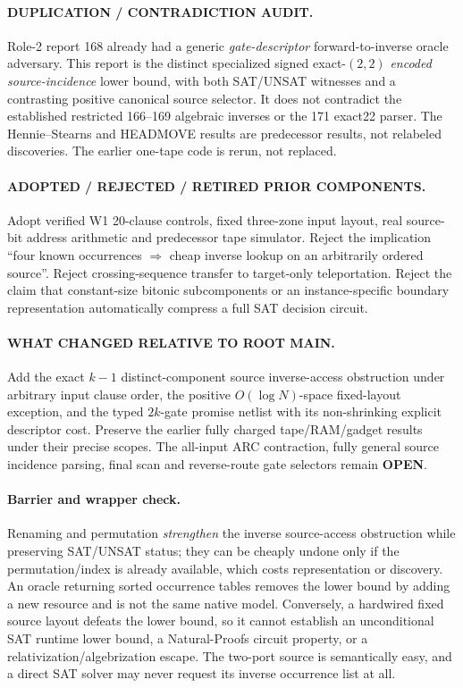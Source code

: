\documentclass[11pt]{article}
\newcommand{\OPEN}{\textbf{OPEN}}
\begin{document}
\paragraph{DUPLICATION / CONTRADICTION AUDIT.}
Role-2 report 168 already had a generic \emph{gate-descriptor} forward-to-inverse oracle adversary. This report is the distinct specialized signed exact-$(2,2)$ \emph{encoded source-incidence} lower bound, with both SAT/UNSAT witnesses and a contrasting positive canonical source selector. It does not contradict the established restricted 166--169 algebraic inverses or the 171 exact22 parser. The Hennie--Stearns and HEADMOVE results are predecessor results, not relabeled discoveries. The earlier one-tape code is rerun, not replaced.

\paragraph{ADOPTED / REJECTED / RETIRED PRIOR COMPONENTS.}
Adopt verified W1 20-clause controls, fixed three-zone input layout, real source-bit address arithmetic and predecessor tape simulator. Reject the implication ``four known occurrences $\Rightarrow$ cheap inverse lookup on an arbitrarily ordered source''. Reject crossing-sequence transfer to target-only teleportation. Reject the claim that constant-size bitonic subcomponents or an instance-specific boundary representation automatically compress a full SAT decision circuit.

\paragraph{WHAT CHANGED RELATIVE TO ROOT MAIN.}
Add the exact $k-1$ distinct-component source inverse-access obstruction under arbitrary input clause order, the positive $O(\log N)$-space fixed-layout exception, and the typed $2k$-gate promise netlist with its non-shrinking explicit descriptor cost. Preserve the earlier fully charged tape/RAM/gadget results under their precise scopes. The all-input ARC contraction, fully general source incidence parsing, final scan and reverse-route gate selectors remain \OPEN.

\paragraph{Barrier and wrapper check.}
Renaming and permutation \emph{strengthen} the inverse source-access obstruction while preserving SAT/UNSAT status; they can be cheaply undone only if the permutation/index is already available, which costs representation or discovery. An oracle returning sorted occurrence tables removes the lower bound by adding a new resource and is not the same native model. Conversely, a hardwired fixed source layout defeats the lower bound, so it cannot establish an unconditional SAT runtime lower bound, a Natural-Proofs circuit property, or a relativization/algebrization escape. The two-port source is semantically easy, and a direct SAT solver may never request its inverse occurrence list at all.
\end{document}
